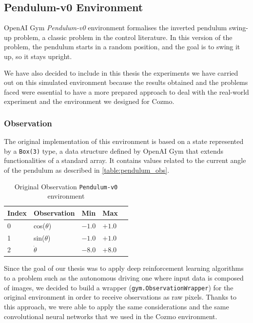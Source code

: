 \subsection{Pendulum-v0 Environment}

OpenAI Gym \textit{Pendulum-v0} environment formalises the inverted pendulum swing-up problem, a classic problem in the control literature.
In this version of the problem, the pendulum starts in a random position, and the goal is to swing it up, so it stays upright.

We have also decided to include in this thesis the experiments we have carried out on this simulated environment because the results obtained and the problems faced were essential to have a more prepared approach to deal with the real-world experiment and the environment we designed for Cozmo.


\subsubsection{Observation}

The original implementation of this environment is based on a state represented by a \texttt{Box(3)} type, a data structure defined by OpenAI Gym that extends functionalities of a standard array.
It contains values related to the current angle of the pendulum as described in \vref{table:pendulum_obs}.

\begin{table}[!h]
    \centering
    \caption{Original Observation \texttt{Pendulum-v0} environment}
    \label{table:pendulum_obs}
    \begin{tabular}{@{}lllll@{}}
        \toprule
        Index & Observation    & Min    & Max    \\ \midrule
        0     & cos($\theta$)  & $-1.0$ & $+1.0$ \\
        1     & sin($\theta$)  & $-1.0$ & $+1.0$ \\
        2     & $\dot{\theta}$ & $-8.0$ & $+8.0$ \\
        \bottomrule
    \end{tabular}
\end{table}

Since the goal of our thesis was to apply deep reinforcement learning algorithms to a problem such as the autonomous driving one where input data is composed of images, we decided to build a wrapper (\texttt{gym.ObservationWrapper}) for the original environment in order to receive observations as raw pixels.
Thanks to this approach, we were able to apply the same considerations and the same convolutional neural networks that we used in the Cozmo environment.

